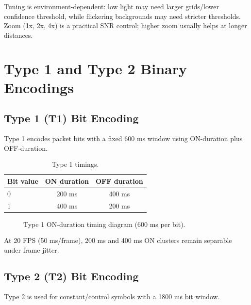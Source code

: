 \documentclass[10pt,a4paper]{article}
\begin{document}
Tuning is environment-dependent: low light may need larger grids/lower confidence threshold, while flickering backgrounds may need stricter thresholds. Zoom (1x, 2x, 4x) is a practical SNR control; higher zoom usually helps at longer distances.

\section{Type 1 and Type 2 Binary Encodings}

\subsection{Type 1 (T1) Bit Encoding}
Type 1 encodes packet bits with a fixed 600 ms window using ON-duration plus OFF-duration.

\begin{table}[H]
\centering
\caption{Type 1 timings.}
\begin{tabular}{lcc}
\toprule
Bit value & ON duration & OFF duration \\
\midrule
0 & 200 ms & 400 ms \\
1 & 400 ms & 200 ms \\
\bottomrule
\end{tabular}
\end{table}

\begin{figure}[H]
\centering
{}
\caption{Type 1 ON-duration timing diagram (600 ms per bit).}
\end{figure}

At 20 FPS (50 ms/frame), 200 ms and 400 ms ON clusters remain separable under frame jitter.

\subsection{Type 2 (T2) Bit Encoding}
Type 2 is used for constant/control symbols with a 1800 ms bit window.
\end{document}
